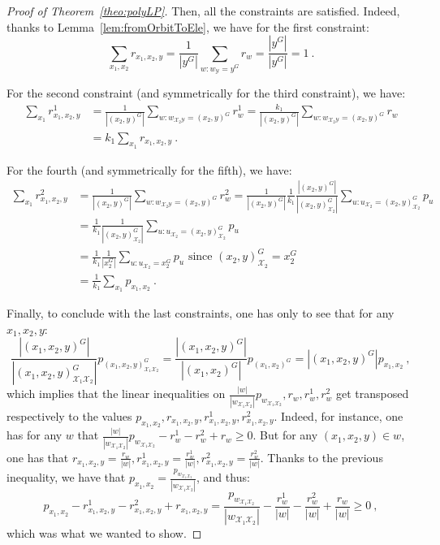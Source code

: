 \begin{proof}[Proof of Theorem~\ref{theo:polyLP}]
   Then, all the constraints are satisfied. Indeed, thanks to Lemma~\ref{lem:fromOrbitToEle}, we have for the first constraint:  
   \[\sum_{x_1,x_2} r_{x_1,x_2,y} = \frac{1}{|y^G|} \sum_{w:w_{\mathcal{Y}}=y^G} r_w = \frac{|y^G|}{|y^G|} = 1 \ .\]
   
   For the second constraint (and symmetrically for the third constraint), we have:
   \begin{equation}
     \begin{aligned}
       \sum_{x_1} r^1_{x_1,x_2,y} &= \frac{1}{|(x_2,y)^G|} \sum_{w:w_{\mathcal{X}_2\mathcal{Y}}=(x_2,y)^G} r^1_w = \frac{k_1}{|(x_2,y)^G|}\sum_{w:w_{\mathcal{X}_2\mathcal{Y}}=(x_2,y)^G} r_w\\
       &= k_1 \sum_{x_1} r_{x_1,x_2,y} \ .
     \end{aligned}
   \end{equation}
  
   For the fourth (and symmetrically for the fifth), we have:
   \begin{equation}
     \begin{aligned}
       \sum_{x_1} r^2_{x_1,x_2,y} &= \frac{1}{|(x_2,y)^G|} \sum_{w:w_{\mathcal{X}_2\mathcal{Y}}=(x_2,y)^G} r^2_w = \frac{1}{|(x_2,y)^G|} \frac{1}{k_1}\frac{|(x_2,y)^G|}{|(x_2,y)^G_{\mathcal{X}_2}|} \sum_{u:u_{\mathcal{X}_2}=(x_2,y)^G_{\mathcal{X}_2}} p_u \\
       &= \frac{1}{k_1}\frac{1}{|(x_2,y)^G_{\mathcal{X}_2}|} \sum_{u:u_{\mathcal{X}_2}=(x_2,y)^G_{\mathcal{X}_2}} p_u\\
       &= \frac{1}{k_1} \frac{1}{|x_2^G|}\sum_{u:u_{\mathcal{X}_2}=x_2^G} p_u \text{ since $(x_2,y)^G_{\mathcal{X}_2} = x_2^{G}$}\\
       &= \frac{1}{k_1} \sum_{x_1} p_{x_1,x_2} \ .
     \end{aligned}
   \end{equation}
   
   Finally, to conclude with the last constraints, one has only to see that for any $x_1,x_2,y$:
   \[\frac{|(x_1,x_2,y)^G|}{|(x_1,x_2,y)^G_{\mathcal{X}_1\mathcal{X}_2}|}p_{(x_1,x_2,y)^G_{\mathcal{X}_1\mathcal{X}_2}} = \frac{|(x_1,x_2,y)^G|}{|(x_1,x_2)^G|}p_{(x_1,x_2)^G} = |(x_1,x_2,y)^G|p_{x_1,x_2}  \ ,\]
   which implies that the linear inequalities on $\frac{|w|}{|w_{\mathcal{X}_1\mathcal{X}_2}|} p_{w_{\mathcal{X}_1\mathcal{X}_2}}, r_w, r^1_w, r^2_w$ get transposed respectively to the values $p_{x_1,x_2}, r_{x_1,x_2,y}, r^1_{x_1,x_2,y}, r^2_{x_1,x_2,y}$. Indeed, for instance, one has for any $w$ that $\frac{|w|}{|w_{\mathcal{X}_1\mathcal{X}_2}|} p_{w_{\mathcal{X}_1\mathcal{X}_2}}- r^1_w - r^2_w + r_w \geq 0$. But for any $(x_1,x_2,y) \in w$, one has that $r_{x_1,x_2,y} = \frac{r_w}{|w|},r^1_{x_1,x_2,y} = \frac{r^1_w}{|w|},r^2_{x_1,x_2,y} = \frac{r^2_w}{|w|}$. Thanks to the previous inequality, we have that $p_{x_1,x_2}  = \frac{p_{w_{\mathcal{X}_1\mathcal{X}_2}}}{|w_{\mathcal{X}_1\mathcal{X}_2}|}$, and thus:
   \[p_{x_1,x_2}- r^1_{x_1,x_2,y}- r^2_{x_1,x_2,y} + r_{x_1,x_2,y} = \frac{p_{w_{\mathcal{X}_1\mathcal{X}_2}}}{|w_{\mathcal{X}_1\mathcal{X}_2}|} - \frac{r^1_w}{|w|} - \frac{r^2_w}{|w|} + \frac{r_w}{|w|} \geq 0 \ ,\]
   which was what we wanted to show.
\end{proof}
  
